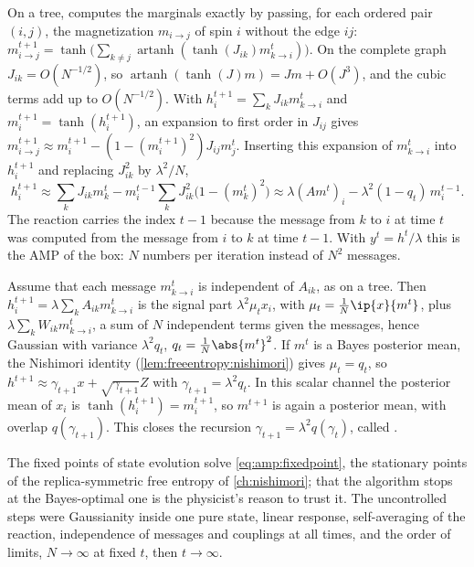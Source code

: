 \begin{refsection}
\begin{heuristic}
On a tree,  computes the marginals exactly by passing, for each ordered pair $(i,j)$, the magnetization $m_{i\to j}$ of spin $i$ without the edge $ij$: $m_{i\to j}^{t+1}=\tanh\bigl(\sum_{k\ne j}\operatorname{artanh}(\tanh(J_{ik})m_{k\to i}^t)\bigr)$. On the complete graph $J_{ik}=O(N^{-1/2})$, so $\operatorname{artanh}(\tanh(J)m)=Jm+O(J^3)$, and the cubic terms add up to $O(N^{-1/2})$. With $h_i^{t+1}=\sum_kJ_{ik}m_{k\to i}^t$ and $m_i^{t+1}=\tanh(h_i^{t+1})$, an expansion to first order in $J_{ij}$ gives $m_{i\to j}^{t+1}\approx m_i^{t+1}-(1-(m_i^{t+1})^2)J_{ij}m_j^t$. Inserting this expansion of $m^t_{k\to i}$ into $h_i^{t+1}$ and replacing $J_{ik}^2$ by $\lambda^2/N$,
\[
h_i^{t+1}\approx\sum_kJ_{ik}m_k^t-m_i^{t-1}\sum_kJ_{ik}^2\bigl(1-(m_k^t)^2\bigr)\approx\lambda(Am^t)_i-\lambda^2(1-q_t)\,m_i^{t-1}.
\]
The reaction carries the index $t-1$ because the message from $k$ to $i$ at time $t$ was computed from the message from $i$ to $k$ at time $t-1$. With $y^t=h^t/\lambda$ this is the AMP of the box: $N$ numbers per iteration instead of $N^2$ messages.
\end{heuristic}

\begin{heuristic}
Assume that each message $m^t_{k\to i}$ is independent of $A_{ik}$, as on a tree. Then $h_i^{t+1}=\lambda\sum_kA_{ik}m_{k\to i}^t$ is the signal part $\lambda^2\mu_tx_i$, with $\mu_t=\frac1N\ip{x}{m^t}$, plus $\lambda\sum_kW_{ik}m_{k\to i}^t$, a sum of $N$ independent terms given the messages, hence Gaussian with variance $\lambda^2q_t$, $q_t=\frac1N\abs{m^t}^2$. If $m^t$ is a Bayes posterior mean, the Nishimori identity (\cref{lem:freeentropy:nishimori}) gives $\mu_t=q_t$, so $h^{t+1}\approx\gamma_{t+1}x+\sqrt{\gamma_{t+1}}Z$ with $\gamma_{t+1}=\lambda^2q_t$. In this scalar channel the posterior mean of $x_i$ is $\tanh(h_i^{t+1})=m_i^{t+1}$, so $m^{t+1}$ is again a posterior mean, with overlap $q(\gamma_{t+1})$. This closes the recursion $\gamma_{t+1}=\lambda^2q(\gamma_t)$, called .
\end{heuristic}

The fixed points of state evolution solve \eqref{eq:amp:fixedpoint}, the stationary points of the replica-symmetric free entropy of \cref{ch:nishimori}; that the algorithm stops at the Bayes-optimal one is the physicist's reason to trust it. The uncontrolled steps were Gaussianity inside one pure state, linear response, self-averaging of the reaction, independence of messages and couplings at all times, and the order of limits, $N\to\infty$ at fixed $t$, then $t\to\infty$.


\end{refsection}
